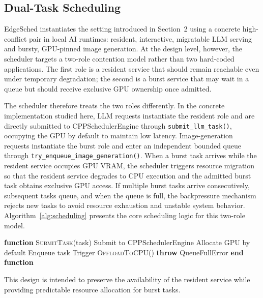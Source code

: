 \subsection{Dual-Task Scheduling}

EdgeSched instantiates the setting introduced in Section~2 using a concrete high-conflict pair in local AI runtimes: resident, interactive, migratable LLM serving and bursty, GPU-pinned image generation. At the design level, however, the scheduler targets a two-role contention model rather than two hard-coded applications. The first role is a resident service that should remain reachable even under temporary degradation; the second is a burst service that may wait in a queue but should receive exclusive GPU ownership once admitted.

The scheduler therefore treats the two roles differently. In the concrete implementation studied here, LLM requests instantiate the resident role and are directly submitted to CPPSchedulerEngine through \texttt{submit\_llm\_task()}, occupying the GPU by default to maintain low latency. Image-generation requests instantiate the burst role and enter an independent bounded queue through \texttt{try\_enqueue\_image\_generation()}. When a burst task arrives while the resident service occupies GPU VRAM, the scheduler triggers resource migration so that the resident service degrades to CPU execution and the admitted burst task obtains exclusive GPU access. If multiple burst tasks arrive consecutively, subsequent tasks queue, and when the queue is full, the backpressure mechanism rejects new tasks to avoid resource exhaustion and unstable system behavior. Algorithm~\ref{alg:scheduling} presents the core scheduling logic for this two-role model.

\begin{algorithm}[!t]
\caption{Task Scheduling with Backpressure}
\label{alg:scheduling}
\begin{algorithmic}[1]
\STATE \textbf{function} \textsc{SubmitTask}(task)
    \STATE Submit to CPPSchedulerEngine
    \STATE Allocate GPU by default
        \STATE Enqueue task
            \STATE Trigger \textsc{OffloadToCPU}()
        \ENDIF
    \ELSE
        \STATE \textbf{throw} QueueFullError
    \ENDIF
\ENDIF
\STATE \textbf{end function}
\end{algorithmic}
\end{algorithm}

This design is intended to preserve the availability of the resident service while providing predictable resource allocation for burst tasks.


